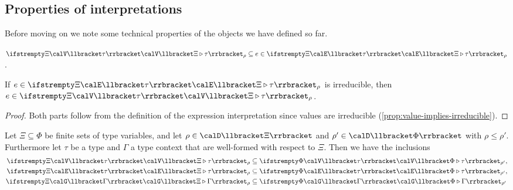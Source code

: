 \subsection{Properties of interpretations}

Before moving on we note some technical properties of the objects we have defined so far.

\begin{lemma}
    \begin{enumlemma}
        \item\label{enum:value-int-in-expression-int} $\valInt{\Xi}{\tau}{\rho} \subseteq e \in \expInt{\Xi}{\tau}{\rho}$.
        
        \item\label{enum:irreducible-expression-int-in-value-int} If $e \in \expInt{\Xi}{\tau}{\rho}$ is irreducible, then $e \in \valInt{\Xi}{\tau}{\rho}$.
    \end{enumlemma}
\end{lemma}

\begin{proof}
    Both parts follow from the definition of the expression interpretation since values are irreducible (\cref{prop:value-implies-irreducible}).
\end{proof}


\begin{lemma}
    \label{lem:interpretations-type-variables}
    Let $\Xi \subseteq \Phi$ be finite sets of type variables, and let $\rho \in \tvarInt{\Xi}$ and $\rho' \in \tvarInt{\Phi}$ with $\rho \leq \rho'$. Furthermore let $\tau$ be a type and $\Gamma$ a type context that are well-formed with respect to $\Xi$. Then we have the inclusions
    \begin{align*}
        \valInt{\Xi}{\tau}{\rho}
            &\subseteq \valInt{\Phi}{\tau}{\rho'}, \\
        \expInt{\Xi}{\tau}{\rho}
            &\subseteq \expInt{\Phi}{\tau}{\rho'}, \\ 
        \conInt{\Xi}{\Gamma}{\rho}
            &\subseteq \conInt{\Phi}{\Gamma}{\rho'}
    \end{align*}
\end{lemma}

